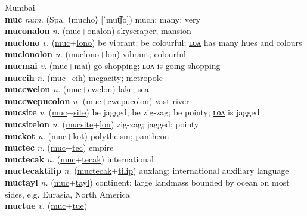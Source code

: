 Mumbai \label{'mumpai} \\
\textbf{muc} \textit{num.} (Spa. ⟨mucho⟩ [ˈmut͡ʃo])
much; many; very \label{muc} \\
\textbf{muconalon} \textit{n.} (\hyperref[muc]{muc}+\hyperref[onalon]{onalon})
skyscraper; mansion \label{muconalon} \\
\textbf{muclono} \textit{v.} (\hyperref[muc]{muc}+\hyperref[lono]{lono})
be vibrant; be colourful; \hyperref[muclonolon]{ʟᴏᴧ} has many hues and colours \label{muclono} \\
\textbf{muclonolon} \textit{n.} (\hyperref[muclono]{muclono}+\hyperref[lon]{lon})
vibrant; colourful \label{muclonolon} \\
\textbf{mucmai} \textit{v.} (\hyperref[muc]{muc}+\hyperref[mai]{mai})
go shopping; ʟᴏᴧ is going shopping \label{mucmai} \\
\textbf{muccih} \textit{n.} (\hyperref[muc]{muc}+\hyperref[cih]{cih})
megacity; metropole \label{muccih} \\
\textbf{muccwelon} \textit{n.} (\hyperref[muc]{muc}+\hyperref[cwelon]{cwelon})
lake; sea \label{muccwelon} \\
\textbf{muccwepucolon} \textit{n.} (\hyperref[muc]{muc}+\hyperref[cwepucolon]{cwepucolon})
vast river \label{muccwepucolon} \\
\textbf{mucsite} \textit{v.} (\hyperref[muc]{muc}+\hyperref[site]{site})
be jagged; be zig-zag; be pointy; \hyperref[mucsitelon]{ʟᴏᴧ} is jagged \label{mucsite} \\
\textbf{mucsitelon} \textit{n.} (\hyperref[mucsite]{mucsite}+\hyperref[lon]{lon})
zig-zag; jagged; pointy \label{mucsitelon} \\
\textbf{muckot} \textit{n.} (\hyperref[muc]{muc}+\hyperref[kot]{kot})
polytheism; pantheon \label{muckot} \\
\textbf{muctec} \textit{n.} (\hyperref[muc]{muc}+\hyperref[tec]{tec})
empire \label{muctec} \\
\textbf{muctecak} \textit{n.} (\hyperref[muc]{muc}+\hyperref[tecak]{tecak})
international \label{muctecak} \\
\textbf{muctecaktilip} \textit{n.} (\hyperref[muctecak]{muctecak}+\hyperref[tilip]{tilip})
auxlang; international auxiliary language \label{muctecaktilip} \\
\textbf{muctayl} \textit{n.} (\hyperref[muc]{muc}+\hyperref[tayl]{tayl})
continent; large landmass bounded by ocean on most sides, e.g. Eurasia, North America \label{muctayl} \\
\textbf{muctue} \textit{v.} (\hyperref[muc]{muc}+\hyperref[tue]{tue})
